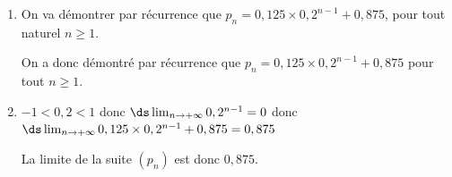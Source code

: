 \begin{enumerate}
\begin{enumerate}
En effet, le  donne $n+1$ termes, et le  donne des valeurs supérieures à 1.		
		
		\item Avec le programme , le résultat affiché pour $n = 5$ sera la liste $\left [p_1\;,\; p_2 \;,\; p_3 \;,\; p_4 \;,\; p_5 \strut \right  ]$.
		
$p_1=1$; $p_2=0,9$; $p_3 = 0,88$;
$p_4 = 0,2p_3 + 0,7 = 0,2\times 0,88 + 0,7 = 0,876$	 et\\
$p_5 = 0,2p_4 + 0,7 = 0,2\times 0,876 + 0,7 = \np{0,8752}$
		
Le résultat affiché par \texttt{repas(5)} sera donc $\left [1\;;\; 0,9 \;;\; 0,88 \;;\; 0,876 \;;\; \np{0,8752} \strut \right]$.
		
	\end{enumerate}
\item On va démontrer par récurrence que $p_n = 0,125 \times 0,2^{n - 1} + 0,875$, pour tout naturel $n \geqslant 1$.


On a donc  démontré par récurrence que $p_{n}= 0,125 \times 0,2^{n -1} + 0,875$ pour tout $n\geqslant 1$.

\item %
$-1<0,2<1$ donc $\ds\lim_{n\to +\infty} 0,2^{n-1}=0$ donc  $\ds\lim_{n\to +\infty} 0,125 \times0,2^{n-1} + 0,875 = 0,875$

La limite de la suite $(p_n)$ est donc $0,875$.
\end{enumerate}

\bigskip

